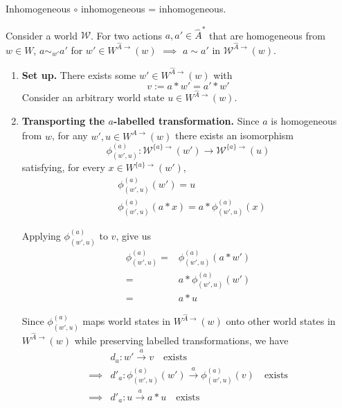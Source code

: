 \begin{propositionE}[][normal]
    Inhomogeneous $\circ$ inhomogeneous = inhomogeneous.
\end{propositionE}
\begin{proofE}
\end{proofE}


\begin{propositionE}
    Consider a world $\mathscr{W}$.
    For two actions $a, a' \in \hat{A}^{*}$ that are homogeneous from $w \in W$, $a \sim_{w'} a'$ for $w' \in W^{\hat{A}\to}(w)$ $\implies$ $a \sim a'$ in $\mathscr{W}^{\hat{A}\to}(w)$.
\end{propositionE}
\begin{proofE}
\begin{enumerate}
    \item \textbf{Set up.}
    There exists some $w' \in W^{\hat{A}\to}(w)$ with
    \begin{equation}
        v := a \ast w' = a' \ast w'
    \end{equation}
    Consider an arbitrary world state $u \in W^{\hat{A}\to}(w)$.

    \item \textbf{Transporting the $a$-labelled transformation.}
    Since $a$ is homogeneous from $w$, for any $w', u \in W^{\hat{A}\to}(w)$ there exists an isomorphism
    \begin{equation}
        \phi_{(w', u)}^{(a)}: \mathscr{W}^{\{a\}\to}(w') \to \mathscr{W}^{\{a\}\to}(u)
    \end{equation}
    satisfying, for every $x \in W^{\{a\}\to}(w')$,
    \begin{align}
        & \phi_{(w', u)}^{(a)}(w') = u \\
        & \phi_{(w', u)}^{(a)}(a \ast x) = a \ast \phi_{(w', u)}^{(a)}(x)
    \end{align}

    Applying $\phi^{(a)}_{(w', u)}$ to $v$, give us
    \begin{align}
        \phi^{(a)}_{(w', u)} = & \phi^{(a)}_{(w', u)}(a \ast w') \\
        = & a \ast \phi^{(a)}_{(w', u)}(w') \\
        = & a \ast u
    \end{align}

    Since $\phi^{(a)}_{(w', u)}$ maps world states in $W^{\hat{A}\to}(w)$ onto other world states in $W^{\hat{A}\to}(w)$ while preserving labelled transformations, we have
    \begin{align}
        & d_{a}: w' \xrightarrow{a} v \quad \text{exists} \\
        \implies & d'_{a}: \phi^{(a)}_{(w', u)}(w') \xrightarrow{a} \phi^{(a)}_{(w', u)}(v) \quad \text{exists} \\
        \implies & d'_{a}: u \xrightarrow{a} a \ast u \quad \text{exists}
    \end{align}


\end{enumerate}
\end{proofE}
